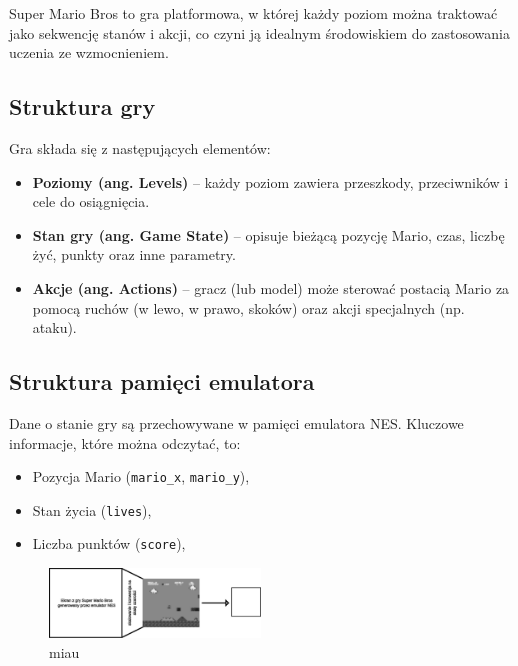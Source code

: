 Super Mario Bros to gra platformowa, w której każdy poziom można traktować jako sekwencję stanów i akcji, co czyni ją idealnym środowiskiem do zastosowania uczenia ze wzmocnieniem.

\subsection{Struktura gry}

Gra składa się z następujących elementów:
\begin{itemize}
    \item \textbf{Poziomy (ang. Levels)} – każdy poziom zawiera przeszkody, przeciwników i cele do osiągnięcia.
    \item \textbf{Stan gry (ang. Game State)} – opisuje bieżącą pozycję Mario, czas, liczbę żyć, punkty oraz inne parametry.
    \item \textbf{Akcje (ang. Actions)} – gracz (lub model) może sterować postacią Mario za pomocą ruchów (w lewo, w prawo, skoków) oraz akcji specjalnych (np. ataku).
\end{itemize}

\subsection{Struktura pamięci emulatora}

Dane o stanie gry są przechowywane w pamięci emulatora NES. Kluczowe informacje, które można odczytać, to:
\begin{itemize}
    \item Pozycja Mario (\texttt{mario\_x}, \texttt{mario\_y}),
    \item Stan życia (\texttt{lives}),
    \item Liczba punktów (\texttt{score}),
\end{itemize}


\begin{figure}[h!]
    \centering
    \includegraphics[width=0.5\textwidth]{img/schemat_nes.svg}
    \caption{miau}
    \label{fig:nes_controller}
\end{figure}

